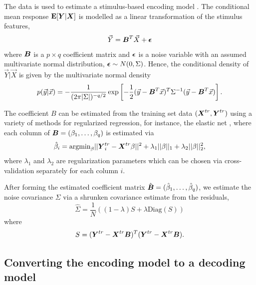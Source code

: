 The data is used to estimate a stimulus-based encoding
model \cite{Kay2008a}\cite{Naselaris2011}\cite{Mitchell2008}.
The conditional mean response $\textbf{E}[\boldsymbol{Y}|\boldsymbol{X}]$ is modelled as
a linear transformation of the stimulus features,
\[
\vec{Y} = \boldsymbol{B}^T \vec{X} + \boldsymbol{\epsilon}
\]
where $\boldsymbol{B}$ is a $p \times q$ coefficient matrix and $\boldsymbol{\epsilon}$ is a
noise variable with an assumed multivariate normal distribution, $\boldsymbol{\epsilon} \sim N(0, \Sigma)$.  
Hence, the conditional density of $\vec{Y}|\vec{X}$ is given by the multivariate normal density
\[
p(\vec{y}|\vec{x}) = -\frac{1}{(2\pi |\Sigma|)^{-q/2}} \exp\left[-\frac{1}{2}(\vec{y} - \boldsymbol{B}^T \vec{x})^T \Sigma^{-1} (\vec{y}-\boldsymbol{B}^T \vec{x})\right].
\]

The coefficient $B$
can be estimated from the training set data $(\boldsymbol{X}^{tr}, \boldsymbol{Y}^{tr})$
using a variety of methods for regularized regression, for instance,
the elastic net \cite{Zou2005}, where each column of $\boldsymbol{B} =
(\beta_1,\hdots, \beta_q)$ is estimated via
\[
\hat{\beta}_i = \text{argmin}_\beta ||\boldsymbol{Y}_i^{tr} - \boldsymbol{X}^{tr} \beta||^2 + \lambda_1 ||\beta||_1 + \lambda_2 ||\beta||_2^2,
\]
where $\lambda_1$ and $\lambda_2$ are regularization parameters which
can be chosen via cross-validation \cite{Hastie2009a} separately for
each column $i$.

After forming the estimated coefficient matrix $\hat{\boldsymbol{B}} =
(\hat{\beta}_1,\hdots, \hat{\beta}_q)$, we estimate the noise
covariance $\Sigma$ via a shrunken covariance
estimate\cite{Ledoit2004}\cite{Daniels2001} from the residuals,
\[
\hat{\Sigma} = \frac{1}{N} ((1-\lambda) S + \lambda \text{Diag}(S)) 
\]
where
\[
S = (\boldsymbol{Y}^{tr} - \boldsymbol{X}^{tr} \boldsymbol{B})^T (\boldsymbol{Y}^{tr} - \boldsymbol{X}^{tr} \boldsymbol{B}).
\]

\subsection{Converting the encoding model to a decoding model}

